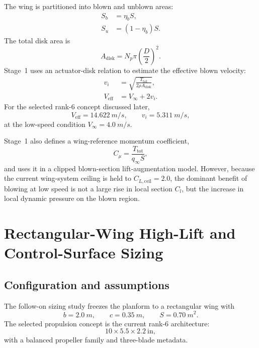 \documentclass[conf]{new-aiaa}
\begin{document}
The wing is partitioned into blown and unblown areas:
\begin{align}
S_b &= \eta_b S, \\
S_u &= (1-\eta_b)S.
\end{align}
The total disk area is
\begin{equation}
A_{\mathrm{disk}} = N_p \pi \left(\frac{D}{2}\right)^2.
\end{equation}
Stage~1 uses an actuator-disk relation to estimate the effective blown velocity:
\begin{align}
v_i &= \sqrt{\frac{T_{\mathrm{tot}}}{2 \rho A_{\mathrm{disk}}}}, \\
V_{\mathrm{eff}} &= V_\infty + 2v_i.
\end{align}
For the selected rank-6 concept discussed later,
\begin{equation}
V_{\mathrm{eff}} = \SI{14.622}{m/s}, \qquad
v_i = \SI{5.311}{m/s},
\end{equation}
at the low-speed condition \(V_\infty = \SI{4.0}{m/s}\).

Stage~1 also defines a wing-reference momentum coefficient,
\begin{equation}
C_\mu = \frac{T_{\mathrm{tot}}}{q_\infty S},
\end{equation}
and uses it in a clipped blown-section lift-augmentation model. However, because the current wing-system ceiling is held to \(C_{L,\mathrm{ceil}} = 2.0\), the dominant benefit of blowing at low speed is not a large rise in local section \(C_l\), but the increase in local dynamic pressure on the blown region.

\section{Rectangular-Wing High-Lift and Control-Surface Sizing}

\subsection{Configuration and assumptions}

The follow-on sizing study freezes the planform to a rectangular wing with
\begin{equation}
b = \SI{2.0}{m},
\qquad
c = \SI{0.35}{m},
\qquad
S = \SI{0.70}{m^2}.
\end{equation}
The selected propulsion concept is the current rank-6 architecture:
\begin{equation}
10 \times 5.5 \times 2.2\ \mathrm{in},
\end{equation}
with a balanced propeller family and three-blade metadata.
\end{document}
